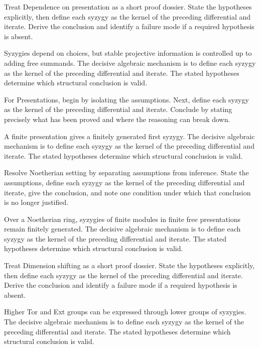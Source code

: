 \begin{problem}\label{prob:v24-problem-03}
Treat Dependence on presentation as a short proof dossier. State the hypotheses explicitly, then define each syzygy as the kernel of the preceding differential and iterate. Derive the conclusion and identify a failure mode if a required hypothesis is absent.
\end{problem}
\begin{solution}
Syzygies depend on choices, but stable projective information is controlled up to adding free summands. The decisive algebraic mechanism is to define each syzygy as the kernel of the preceding differential and iterate. The stated hypotheses determine which structural conclusion is valid.
\end{solution}

\begin{problem}\label{prob:v24-problem-04}
For Presentations, begin by isolating the assumptions. Next, define each syzygy as the kernel of the preceding differential and iterate. Conclude by stating precisely what has been proved and where the reasoning can break down.
\end{problem}
\begin{solution}
A finite presentation gives a finitely generated first syzygy. The decisive algebraic mechanism is to define each syzygy as the kernel of the preceding differential and iterate. The stated hypotheses determine which structural conclusion is valid.
\end{solution}

\begin{problem}\label{prob:v24-problem-05}
Resolve Noetherian setting by separating assumptions from inference. State the assumptions, define each syzygy as the kernel of the preceding differential and iterate, give the conclusion, and note one condition under which that conclusion is no longer justified.
\end{problem}
\begin{solution}
Over a Noetherian ring, syzygies of finite modules in finite free presentations remain finitely generated. The decisive algebraic mechanism is to define each syzygy as the kernel of the preceding differential and iterate. The stated hypotheses determine which structural conclusion is valid.
\end{solution}

\begin{problem}\label{prob:v24-problem-06}
Treat Dimension shifting as a short proof dossier. State the hypotheses explicitly, then define each syzygy as the kernel of the preceding differential and iterate. Derive the conclusion and identify a failure mode if a required hypothesis is absent.
\end{problem}
\begin{solution}
Higher Tor and Ext groups can be expressed through lower groups of syzygies. The decisive algebraic mechanism is to define each syzygy as the kernel of the preceding differential and iterate. The stated hypotheses determine which structural conclusion is valid.
\end{solution}

